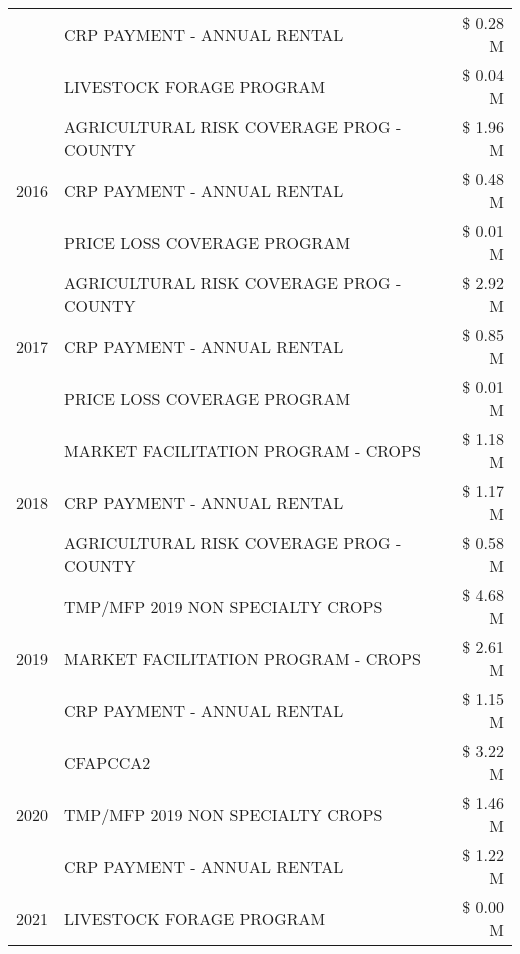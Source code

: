 \begin{tabular}{llr}
 & CRP PAYMENT - ANNUAL RENTAL & \$ 0.28 M \\
 & LIVESTOCK FORAGE PROGRAM & \$ 0.04 M \\
\cline{1-3}
\multirow[t]{3}{*}{2016} & AGRICULTURAL RISK COVERAGE PROG - COUNTY & \$ 1.96 M \\
 & CRP PAYMENT - ANNUAL RENTAL & \$ 0.48 M \\
 & PRICE LOSS COVERAGE PROGRAM & \$ 0.01 M \\
\cline{1-3}
\multirow[t]{3}{*}{2017} & AGRICULTURAL RISK COVERAGE PROG - COUNTY & \$ 2.92 M \\
 & CRP PAYMENT - ANNUAL RENTAL & \$ 0.85 M \\
 & PRICE LOSS COVERAGE PROGRAM & \$ 0.01 M \\
\cline{1-3}
\multirow[t]{3}{*}{2018} & MARKET FACILITATION PROGRAM - CROPS & \$ 1.18 M \\
 & CRP PAYMENT - ANNUAL RENTAL & \$ 1.17 M \\
 & AGRICULTURAL RISK COVERAGE PROG - COUNTY & \$ 0.58 M \\
\cline{1-3}
\multirow[t]{3}{*}{2019} & TMP/MFP 2019 NON SPECIALTY CROPS & \$ 4.68 M \\
 & MARKET FACILITATION PROGRAM - CROPS & \$ 2.61 M \\
 & CRP PAYMENT - ANNUAL RENTAL & \$ 1.15 M \\
\cline{1-3}
\multirow[t]{3}{*}{2020} & CFAPCCA2 & \$ 3.22 M \\
 & TMP/MFP 2019 NON SPECIALTY CROPS & \$ 1.46 M \\
 & CRP PAYMENT - ANNUAL RENTAL & \$ 1.22 M \\
\cline{1-3}
2021 & LIVESTOCK FORAGE PROGRAM & \$ 0.00 M \\
\cline{1-3}
\bottomrule
\end{tabular}
